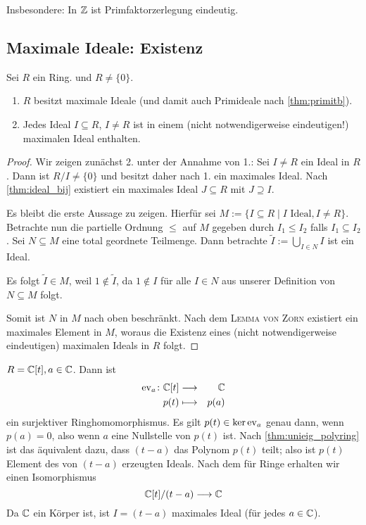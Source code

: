 \documentclass[12pt,a4paper]{scrartcl}
\begin{document}
\begin{bem}
	Insbesondere: In $\mathbb Z$ ist Primfaktorzerlegung \glqq eindeutig\grqq.
\end{bem}

\subsection{Maximale Ideale: Existenz}
\begin{satz}\label{thm:max_ideal_ex}
	Sei $R$ ein Ring.
	und $R \neq \{0\}$.
	\begin{enumerate}
		\item $R$ besitzt maximale Ideale \textup(und damit auch Primideale nach \cref{thm:primitb}\textup).
		\item Jedes Ideal $I\subseteq R$, $I \neq R$ ist in einem \textup(nicht notwendigerweise eindeutigen!\textup) maximalen Ideal enthalten.
	\end{enumerate}
\end{satz}
\begin{proof}
	Wir zeigen zunächst 2. unter der Annahme von 1.: Sei $I\neq R$ ein Ideal in $R$. Dann ist $R/I \neq \{0\}$  und besitzt daher nach 1. ein maximales Ideal. Nach \cref{thm:ideal_bij} existiert ein maximales Ideal $J\subseteq R$ mit $J\supseteq I$.
	
	
	Es bleibt die erste Aussage zu zeigen. Hierfür sei $M := \{I\subseteq R\mid I\text{ Ideal}, I \neq R\}$. Betrachte nun die partielle Ordnung $\leq$ auf $M$ gegeben durch $I_1\leq I_2$ falls $I_1\subseteq I_2$. Sei $N\subseteq M$ eine total geordnete Teilmenge. Dann betrachte $\tilde{I} := \bigcup\limits_{I\in N} I$ ist ein Ideal.
	
	Es folgt $\tilde{I}\in M$, weil $1\notin \tilde{I}$, da $1\notin I$ für alle $ I\in N$ aus unserer Definition von $N\subseteq M$ folgt.
	
	Somit ist $N$ in $M$ nach oben beschränkt. Nach dem \textsc{Lemma von Zorn} existiert ein maximales Element in $M$, woraus die Existenz eines (nicht notwendigerweise eindeutigen) maximalen Ideals in $R$ folgt.
\end{proof}
\begin{bsp}
	$R = \mathbb C[t], a\in \mathbb C$. Dann ist
	\begin{eqnarray*}
		\operatorname{ev}_a\colon \mathbb C[t] & \longrightarrow & \mathbb C\\
		p(t) & \longmapsto & p(a)
	\end{eqnarray*}
	ein surjektiver Ringhomomorphismus. Es gilt $p(t) \in \operatorname{ker}\operatorname{ev}_a$ genau dann, wenn $p(a) = 0$, also wenn $a$ eine Nullstelle von $p(t)$ ist. Nach \cref{thm:unieig_polyring} ist das äquivalent dazu, dass $(t-a)$ das Polynom $p(t)$ teilt; also ist $p(t)$ Element des von $(t-a)$ erzeugten Ideals. Nach dem  für Ringe erhalten wir einen Isomorphismus
	$$ \mathbb C[t]/(t-a) \longrightarrow \mathbb C$$
	Da $\mathbb C$ ein Körper ist, ist $I = (t-a)$ maximales Ideal (für jedes $a\in \mathbb C$).
\end{bsp}
\end{document}
